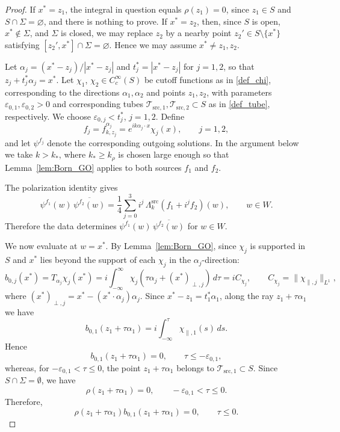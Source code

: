 \documentclass[12pt,a4paper]{amsart}
\numberwithin{equation}{section}
\theoremstyle{plain}
\theoremstyle{definition}
\begin{document}
\begin{proof}
If $x^*=z_1$, the integral in question equals $\rho(z_1)=0$, since $z_1\in S$ and $S\cap\Sigma=\varnothing$, and there is nothing to prove. If $x^*=z_2$, then, since $S$ is open, $x^*\notin\Sigma$, and $\Sigma$ is closed, we may
replace $z_2$ by a nearby point $z_2'\in S\setminus\{x^*\}$ satisfying $[z_2',x^*]\cap\Sigma=\varnothing$. Hence we may assume $x^*\neq z_1,z_2$.

Let $\alpha_j = (x^*-z_j)/|x^*-z_j|$ and $t_j^* = |x^*-z_j|$ for $j=1,2$,
so that $z_j + t_j^*\alpha_j = x^*$. Let $\chi_1$, $\chi_2\in C_c^\infty(S)$ be cutoff functions as in \eqref{def_chi}, corresponding to the directions $\alpha_1,\alpha_2$ and points $z_1,z_2$, with parameters $\varepsilon_{0,1},\varepsilon_{0,2}>0$ and corresponding tubes $\mathcal T_{\mathrm{src},1},\mathcal T_{\mathrm{src},2}\subset S$ as in \eqref{def_tube}, respectively. We choose $\varepsilon_{0,j}<t_j^*$, $j=1,2$. Define
\begin{equation*}
    f_j = f_{k,z_j}^{\alpha_j} = e^{ik\alpha_j\cdot x}\chi_j(x),
    \qquad j=1,2,
\end{equation*}
and let $\psi^{f_j}$ denote the corresponding outgoing solutions. In the argument below we take $k>k_*$, where $k_*\geq k_\rho$ is chosen
large enough so that Lemma~\ref{lem:Born_GO} applies to both sources
$f_1$ and $f_2$.

The polarization identity gives
\begin{equation}\label{eq:polarization}
    \psi^{f_1}(w)\,\overline{\psi^{f_2}(w)}
    = \frac{1}{4}\sum_{j=0}^{3}i^{j}\,
    \Lambda_k^{\mathrm{src}}(f_1+i^{j}f_2)(w),
    \qquad w\in W.
\end{equation}
Therefore the data determines
$\psi^{f_1}(w)\,\overline{\psi^{f_2}(w)}$ for $w\in W$.

We now evaluate at $w=x^*$.
By Lemma~\ref{lem:Born_GO}, since $\chi_j$ is supported in $S$
and $x^*$ lies beyond the support of each $\chi_j$ in the $\alpha_j$-direction:
\begin{equation*}
    b_{0,j}(x^*) = T_{\alpha_j}\chi_j(x^*) = i\int_{-\infty}^{\infty}\chi_j(\tau\alpha_j+(x^*)_{\perp,j})\,d\tau
    = iC_{\chi_j},
    \qquad C_{\chi_j} = \|\chi_{\parallel,j}\|_{L^1},
\end{equation*}
where $(x^*)_{\perp,j} = x^* - (x^*\cdot\alpha_j)\alpha_j$. Since $x^*-z_1=t_1^*\alpha_1$, along the ray
$z_1+\tau\alpha_1$ we have
\[
b_{0,1}(z_1+\tau\alpha_1)
=
i\int_{-\infty}^{\tau}\chi_{\parallel,1}(s)\,ds.
\]
Hence
\[
b_{0,1}(z_1+\tau\alpha_1)=0,
\qquad \tau\leq -\varepsilon_{0,1},
\]
whereas, for $-\varepsilon_{0,1}<\tau\leq 0$, the point
$z_1+\tau\alpha_1$ belongs to
$\mathcal T_{\mathrm{src},1}\subset S$. Since
$S\cap\Sigma=\emptyset$, we have
\[
\rho(z_1+\tau\alpha_1)=0,
\qquad -\varepsilon_{0,1}<\tau\leq 0.
\]
Therefore,
\[
\rho(z_1+\tau\alpha_1)
b_{0,1}(z_1+\tau\alpha_1)=0,
\qquad \tau\leq 0.
\]


\end{proof}
\end{document}
